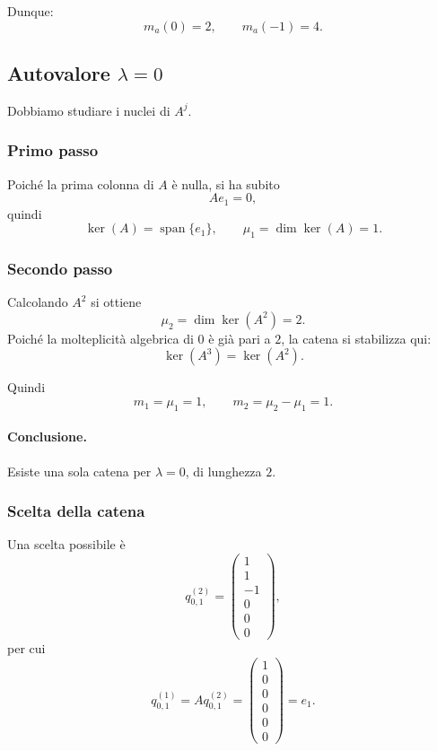 Dunque:
\[
m_a(0)=2,
\qquad
m_a(-1)=4.
\]

\subsection{Autovalore \texorpdfstring{$\lambda=0$}{lambda=0}}

Dobbiamo studiare i nuclei di $A^j$.

\subsubsection*{Primo passo}

Poiché la prima colonna di $A$ è nulla, si ha subito
\[
Ae_1=0,
\]
quindi
\[
\ker(A)=\operatorname{span}\{e_1\},
\qquad
\mu_1=\dim\ker(A)=1.
\]

\subsubsection*{Secondo passo}

Calcolando $A^2$ si ottiene
\[
\mu_2=\dim\ker(A^2)=2.
\]
Poiché la molteplicità algebrica di $0$ è già pari a $2$, la catena si stabilizza qui:
\[
\ker(A^3)=\ker(A^2).
\]

Quindi
\[
m_1=\mu_1=1,
\qquad
m_2=\mu_2-\mu_1=1.
\]

\paragraph{Conclusione.}
Esiste una sola catena per $\lambda=0$, di lunghezza $2$.

\subsubsection*{Scelta della catena}

Una scelta possibile è
\[
q_{0,1}^{(2)}=
\begin{pmatrix}
1\\
1\\
-1\\
0\\
0\\
0
\end{pmatrix},
\]
per cui
\[
q_{0,1}^{(1)}=Aq_{0,1}^{(2)}=
\begin{pmatrix}
1\\
0\\
0\\
0\\
0\\
0
\end{pmatrix}
=e_1.
\]

